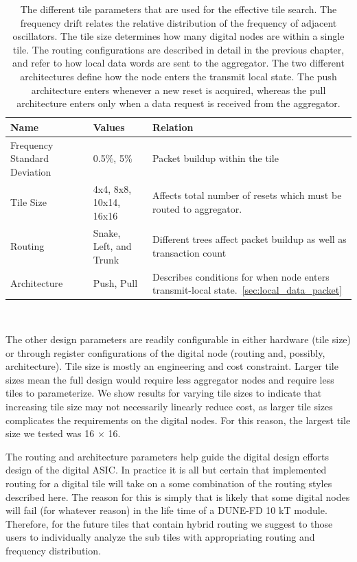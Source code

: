 \begin{table}
\begin{center}
\begin{tabular}{|| p{30mm} | p{30mm} | p{90mm} ||}
 \hline
 Name & Values & Relation \\ [0.5ex]
 \hline\hline
  Frequency Standard Deviation & 0.5\%, 5\% & Packet buildup within the tile \\
 \hline
  Tile Size & 4x4, 8x8, 10x14, 16x16 & Affects total number of resets which must be routed to aggregator.\\
 \hline
  Routing & Snake, Left, and Trunk & Different trees affect packet buildup as well as transaction count  \\
 \hline
  Architecture & Push, Pull & Describes conditions for when node enters transmit-local state.~\ref{sec:local_data_packet}  \\
 \hline
\end{tabular}
\caption{The different tile parameters that are used for the effective tile search.
  The frequency drift relates the relative distribution of the frequency of adjacent oscillators.
  The tile size determines how many digital nodes are within a single tile.
  The routing configurations are described in detail in the previous chapter, and refer to how local data words are sent to the aggregator.
  The two different architectures define how the node enters the transmit local state.
  The push architecture enters whenever a new reset is acquired, whereas the pull architecture enters only when a data request is received from the aggregator.}
\end{center}
\end{table}
~\label{table:tile_params}

The other design parameters are readily configurable in either hardware (tile size) or through register configurations of the digital node (routing and, possibly, architecture).
Tile size is mostly an engineering and cost constraint.
Larger tile sizes mean the full design would require less aggregator nodes and require less tiles to parameterize.
We show results for varying tile sizes to indicate that increasing tile size may not necessarily linearly reduce cost, as larger tile sizes complicates the requirements on the digital nodes.
For this reason, the largest tile size we tested was 16 $\times$ 16.

The routing and architecture parameters help guide the digital design efforts design of the digital ASIC.
In practice it is all but certain that implemented routing for a digital tile will take on a some combination of the routing styles described here.
The reason for this is simply that is likely that some digital nodes will fail (for whatever reason) in the life time of a DUNE-FD 10 kT module.
Therefore, for the future tiles that contain hybrid routing we suggest to those users to individually analyze the sub tiles with appropriating routing and frequency distribution.

